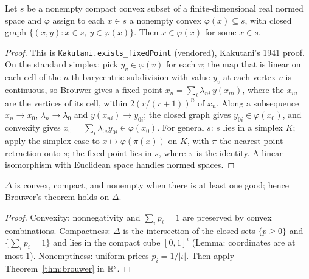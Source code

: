 \begin{theorem}
\label{thm:kakutani}
\leanok
{}
Let $s$ be a nonempty compact convex subset of a finite-dimensional real normed space and $\varphi$ assign to each
$x \in s$ a nonempty convex $\varphi(x) \subseteq s$, with closed graph $\{(x, y) : x \in s,\ y \in \varphi(x)\}$. Then
$x \in \varphi(x)$ for some $x \in s$.
\end{theorem}
\begin{proof}
\leanok
This is \texttt{Kakutani.exists\_fixedPoint} (vendored), Kakutani's 1941 proof. On the standard simplex: pick
$y_v \in \varphi(v)$ for each $v$; the map that is linear on each cell of the $n$-th barycentric subdivision with value
$y_v$ at each vertex $v$ is continuous, so Brouwer gives a fixed point $x_n = \sum_i \lambda_{ni}\, y(x_{ni})$, where
the $x_{ni}$ are the vertices of its cell, within $2(r/(r+1))^n$ of $x_n$. Along a subsequence $x_n \to x_0$,
$\lambda_n \to \lambda_0$ and $y(x_{ni}) \to y_{0i}$; the closed graph gives $y_{0i} \in \varphi(x_0)$, and convexity
gives $x_0 = \sum_i \lambda_{0i} y_{0i} \in \varphi(x_0)$. For general $s$: $s$ lies in a simplex $K$; apply the simplex
case to $x \mapsto \varphi(\pi(x))$ on $K$, with $\pi$ the nearest-point retraction onto $s$; the fixed point lies in
$s$, where $\pi$ is the identity. A linear isomorphism with Euclidean space handles normed spaces.
\end{proof}

\begin{lemma}
\label{lem:priceSimplex_brouwer}
\leanok
{}
$\Delta$ is convex, compact, and nonempty when there is at least one good; hence Brouwer's theorem holds on $\Delta$.
\end{lemma}
\begin{proof}
\leanok
Convexity: nonnegativity and $\sum_i p_i = 1$ are preserved by convex combinations. Compactness: $\Delta$ is the
intersection of the closed sets $\{p \ge 0\}$ and $\{\sum_i p_i = 1\}$ and lies in the compact cube $[0,1]^\iota$
(Lemma: coordinates are at most $1$). Nonemptiness: uniform prices $p_i = 1/|\iota|$. Then apply
Theorem~\ref{thm:brouwer} in $\mathbb{R}^\iota$.
\end{proof}

